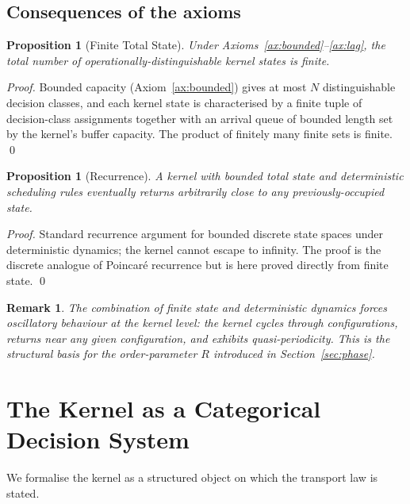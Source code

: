 \documentclass[twocolumn,11pt,a4paper]{article}
\newtheorem{proposition}[theorem]{Proposition}
\newtheorem{remark}[theorem]{Remark}
\newcommand{\Rens}{R}
\begin{document}
\subsection{Consequences of the axioms}

\begin{proposition}[Finite Total State]
\label{prop:finite-state}
Under Axioms~\ref{ax:bounded}--\ref{ax:lag}, the total number of operationally-distinguishable kernel states is finite.
\end{proposition}

\begin{proof}
Bounded capacity (Axiom~\ref{ax:bounded}) gives at most $N$ distinguishable decision classes, and each kernel state is characterised by a finite tuple of decision-class assignments together with an arrival queue of bounded length set by the kernel's buffer capacity. The product of finitely many finite sets is finite. \qed
\end{proof}

\begin{proposition}[Recurrence]
\label{prop:recurrence}
A kernel with bounded total state and deterministic scheduling rules eventually returns arbitrarily close to any previously-occupied state.
\end{proposition}

\begin{proof}
Standard recurrence argument for bounded discrete state spaces under deterministic dynamics; the kernel cannot escape to infinity. The proof is the discrete analogue of Poincar\'{e} recurrence \citep{poincare1890} but is here proved directly from finite state. \qed
\end{proof}

\begin{remark}
\label{rem:oscillatory}
The combination of finite state and deterministic dynamics forces \emph{oscillatory} behaviour at the kernel level: the kernel cycles through configurations, returns near any given configuration, and exhibits quasi-periodicity. This is the structural basis for the order-parameter $\Rens$ introduced in Section~\ref{sec:phase}.
\end{remark}

\section{The Kernel as a Categorical Decision System}
\label{sec:cat}

We formalise the kernel as a structured object on which the transport law is stated.
\end{document}
